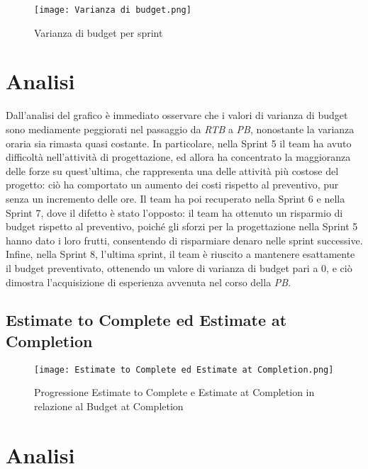 \begin{figure}[h] 
    \centering
    \texttt{[image: Varianza di budget.png]}
    \caption{Varianza di budget per sprint} 
    \label{fig: Varianza di budget}
\end{figure}

\section*{Analisi}

Dall’analisi del grafico è immediato osservare che i valori di varianza di budget sono mediamente
peggiorati nel passaggio da \emph{RTB} a \emph{PB}, nonostante la varianza oraria sia rimasta quasi costante. In particolare, nella Sprint 5 il team ha avuto difficoltà nell'attività di progettazione, ed allora ha concentrato la maggioranza delle forze su quest'ultima, che rappresenta una delle attività più costose del progetto: ciò ha comportato un aumento dei costi rispetto al preventivo, pur senza un incremento delle ore. Il team ha poi recuperato nella Sprint 6 e nella Sprint 7, dove il difetto è stato l'opposto: il team ha ottenuto un risparmio di budget rispetto al preventivo, poiché gli sforzi per la progettazione nella Sprint 5 hanno dato i loro frutti, consentendo di risparmiare denaro nelle sprint successive. Infine, nella Sprint 8, l'ultima sprint, il team è riuscito a mantenere esattamente il budget preventivato, ottenendo un valore di varianza di budget pari a 0, e ciò dimostra l'acquisizione di esperienza avvenuta nel corso della \emph{PB}.

\newpage

\subsection{Estimate to Complete ed Estimate at Completion}
\label{subsec:Estimate to Complete ed Estimate at Completion}

\begin{figure}[h] 
    \centering
    \texttt{[image: Estimate to Complete ed Estimate at Completion.png]}
    \caption{Progressione Estimate to Complete e Estimate at Completion in relazione al Budget at Completion} 
    \label{fig: Estimate to Complete ed Estimate at Completion}
\end{figure}

\section*{Analisi}

